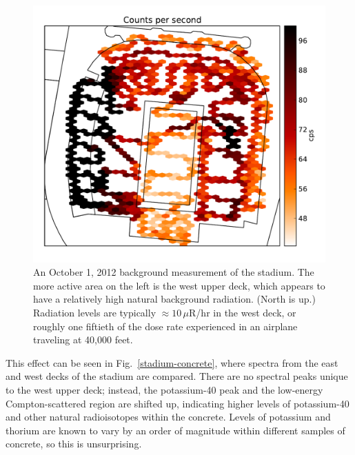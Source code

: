\begin{figure}
  \centering
  \includegraphics[width=\textwidth]{figures/stadium-heatmap.pdf}
  \caption{An October 1, 2012 background measurement of the stadium. The more
    active area on the left is the west upper deck, which appears to have a
    relatively high natural background radiation. (North is up.) Radiation
    levels are typically \(\approx 10 \,\mu\)R/hr in the west deck, or roughly
    one fiftieth of the dose rate experienced in an airplane traveling at 40,000
    feet.}
  \label{stadium-heatmap}
\end{figure}

This effect can be seen in Fig.~\ref{stadium-concrete}, where spectra from the
east and west decks of the stadium are compared. There are no spectral peaks
unique to the west upper deck; instead, the potassium-40 peak and the low-energy
Compton-scattered region are shifted up, indicating higher levels of
potassium-40 and other natural radioisotopes within the concrete. Levels of
potassium and thorium are known to vary by an order of magnitude within
different samples of concrete, so this is unsurprising.\cite{Ryan:2011wh}

